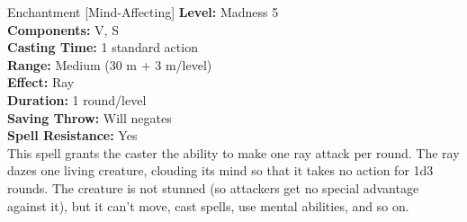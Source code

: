 {Enchantment [Mind-Affecting]}
{
	\textbf{Level:} Madness 5\\
	\textbf{Components:} V, S\\
	\textbf{Casting Time:} 1 standard action\\
	\textbf{Range:} Medium (30 m + 3 m/level)\\
	\textbf{Effect:} Ray\\
	\textbf{Duration:} 1 round/level\\
	\textbf{Saving Throw:} Will negates\\
	\textbf{Spell Resistance:} Yes\\
}
{
	This spell grants the caster the ability to make one ray attack per round. The ray dazes one living creature, clouding its mind so that it takes no action for 1d3 rounds. The creature is not stunned (so attackers get no special advantage against it), but it can't move, cast spells, use mental abilities, and so on.
}